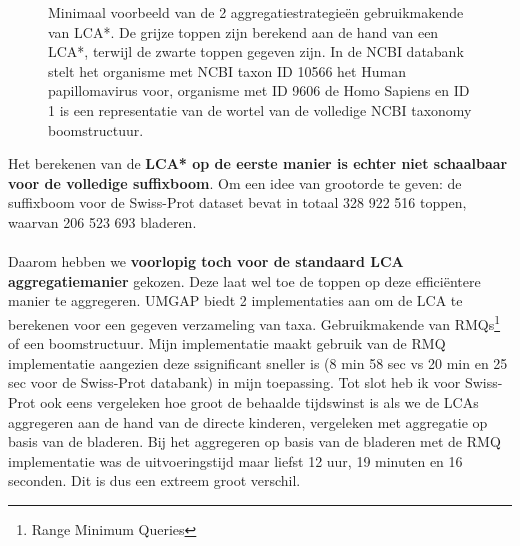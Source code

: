 \begin{figure}[ht]
    \centering
    \hspace{0.25\textwidth}%
    \caption{Minimaal voorbeeld van de 2 aggregatiestrategieën gebruikmakende van LCA*. De grijze toppen zijn berekend aan de hand van een LCA*, terwijl de zwarte toppen gegeven zijn. In de NCBI databank stelt het organisme met NCBI taxon ID 10566 het Human papillomavirus voor, organisme met ID 9606 de Homo Sapiens en ID 1 is een representatie van de wortel van de volledige NCBI taxonomy boomstructuur.}\label{fig:lca*_diff}
\end{figure}

Het berekenen van de \textbf{LCA* op de eerste manier is echter niet schaalbaar voor de volledige suffixboom}.
Om een idee van grootorde te geven: de suffixboom voor de Swiss-Prot dataset bevat in totaal 328 922 516 toppen, waarvan 206 523 693 bladeren.
\\ \\
Daarom hebben we \textbf{voorlopig toch voor de standaard LCA aggregatiemanier} gekozen.
Deze laat wel toe de toppen op deze efficiëntere manier te aggregeren.
UMGAP biedt 2 implementaties aan om de LCA te berekenen voor een gegeven verzameling van taxa.
Gebruikmakende van RMQs\footnote{Range Minimum Queries} of een boomstructuur.
Mijn implementatie maakt gebruik van de RMQ implementatie aangezien deze ssignificant sneller is (8 min 58 sec vs 20 min en 25 sec voor de Swiss-Prot databank) in mijn toepassing.
Tot slot heb ik voor Swiss-Prot ook eens vergeleken hoe groot de behaalde tijdswinst is als we de LCAs aggregeren aan de hand van de directe kinderen, vergeleken met aggregatie op basis van de bladeren.
Bij het aggregeren op basis van de bladeren met de RMQ implementatie was de uitvoeringstijd maar liefst 12 uur, 19 minuten en 16 seconden.
Dit is dus een extreem groot verschil.

